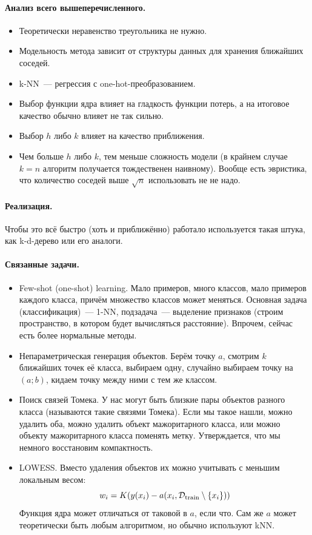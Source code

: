 \documentclass{article}
\begin{document}
    \paragraph{Анализ всего вышеперечисленного.}
    \begin{itemize}
        \item Теоретически неравенство треугольника не нужно.
        \item Модельность метода зависит от структуры данных для хранения ближайших соседей.
        \item k-NN~--- регрессия с one-hot-преобразованием.
        \item Выбор функции ядра влияет на гладкость функции потерь, а на итоговое качество обычно влияет не так сильно.
        \item Выбор $h$ либо $k$ влияет на качество приближения.
        \item Чем больше $h$ либо $k$, тем меньше сложность модели (в крайнем случае $k=n$ алгоритм получается тождественен наивному). Вообще есть эвристика, что количество соседей выше $\sqrt n$ использовать не не надо.
    \end{itemize}
    \paragraph{Реализация.}
    Чтобы это всё быстро (хоть и приближённо) работало используется такая штука, как k-d-дерево или его аналоги.
    \paragraph{Связанные задачи.}
    \begin{itemize}
        \item Few-shot (one-shot) learning. Мало примеров, много классов, мало примеров каждого класса, причём множество классов может меняться. Основная задача (классификация)~--- 1-NN, подзадача~--- выделение признаков (строим пространство, в котором будет вычисляться расстояние). Впрочем, сейчас есть более нормальные методы.
        \item Непараметрическая генерация объектов. Берём точку $a$, смотрим $k$ ближайших точек её класса, выбираем одну, случайно выбираем точку на $(a;b)$, кидаем точку между ними с тем же классом.
        \item Поиск связей Томека. У нас могут быть близкие пары объектов разного класса (называются такие связями Томека). Если мы такое нашли, можно удалить оба, можно удалить объект мажоритарного класса, или можно объекту мажоритарного класса поменять метку. Утверждается, что мы немного восстановим компактность.
        \item LOWESS. Вместо удаления объектов их можно учитывать с меньшим локальным весом:
        \[
        w_i=K(y(x_i)-a(x_i,{\mathcal{D}}_{\mathrm{train}}\setminus\{x_i\}))
        \]
        Функция ядра может отличаться от таковой в $a$, если что. Сам же $a$ может теоретически быть любым алгоритмом, но обычно используют kNN.
    \end{itemize}
\end{document}

